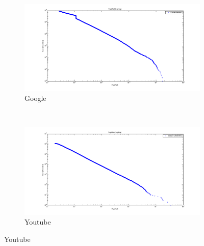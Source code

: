 \begin{figure}
    \centering
    \begin{subfigure}[htbp]{0.9\textwidth}
            \includegraphics[width=\textwidth]{FIG/pr-google.png}
            \caption{Google}
            \label{fig:pr-google}
    \end{subfigure}
    ~ %
    \begin{subfigure}[htbp]{0.9\textwidth}
            \includegraphics[width=\textwidth]{FIG/pr-youtube.png}
            \caption{Youtube}
            \label{fig:pr-youtube}
    \end{subfigure}
\end{figure} 

\addtocounter{figure}{-1}

